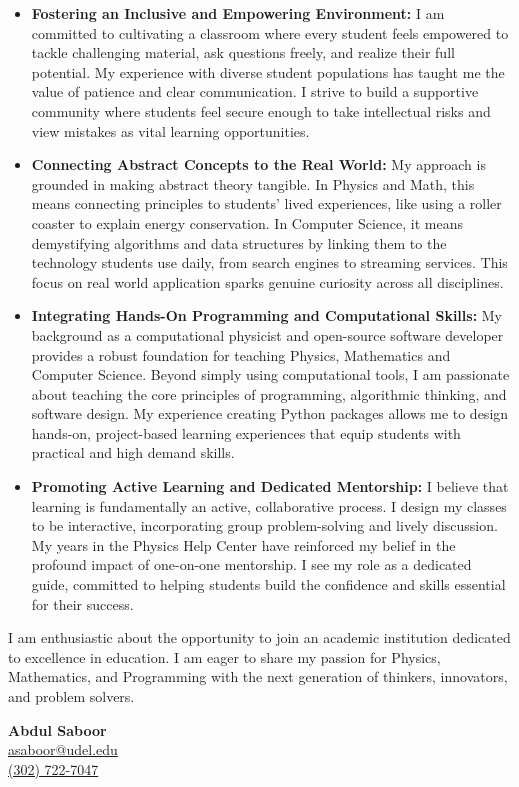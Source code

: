 \documentclass[letter,11pt]{article}
\begin{document}
\begin{itemize}
    \item \textbf{Fostering an Inclusive and Empowering Environment:} I am committed to 
    cultivating a classroom where every student feels empowered to tackle challenging material, 
    ask questions freely, and realize their full potential. My experience with diverse student 
    populations has taught me the value of patience and clear communication. I strive to build 
    a supportive community where students feel secure enough to take intellectual risks and view 
    mistakes as vital learning opportunities.

    \item \textbf{Connecting Abstract Concepts to the Real World:} My approach is grounded in making 
    abstract theory tangible. In Physics and Math, this means connecting principles to students' lived 
    experiences, like using a roller coaster to explain energy conservation. In Computer Science, 
    it means demystifying algorithms and data structures by linking them to the technology students 
    use daily, from search engines to streaming services. This focus on real world application sparks 
    genuine curiosity across all disciplines.

    \item \textbf{Integrating Hands-On Programming and Computational Skills:} My background as a computational 
    physicist and open-source software developer provides a robust foundation for teaching Physics, Mathematics and Computer Science. 
    Beyond simply using computational tools, I am passionate about teaching the core principles of programming, 
    algorithmic thinking, and software design. My experience creating Python packages allows me to design hands-on, 
    project-based learning experiences that equip students with practical and high demand skills.

    \item \textbf{Promoting Active Learning and Dedicated Mentorship:} I believe that learning is fundamentally an 
    active, collaborative process. I design my classes to be interactive, incorporating group problem-solving and 
    lively discussion. My years in the Physics Help Center have reinforced my belief in the profound impact of 
    one-on-one mentorship. I see my role as a dedicated guide, committed to helping students build the confidence 
    and skills essential for their success.
\end{itemize}

\vspace{4mm}
I am enthusiastic about the opportunity to join an academic institution 
dedicated to excellence in education. I am eager to share my passion for 
Physics, Mathematics, and Programming with the next generation of thinkers, 
innovators, and problem solvers.

\vspace{5mm}
\noindent
\textbf{Abdul Saboor} \\
\href{mailto:asaboor@udel.edu}{asaboor@udel.edu} \\
\href{tel:+13027227047}{(302) 722-7047}
\end{document}
